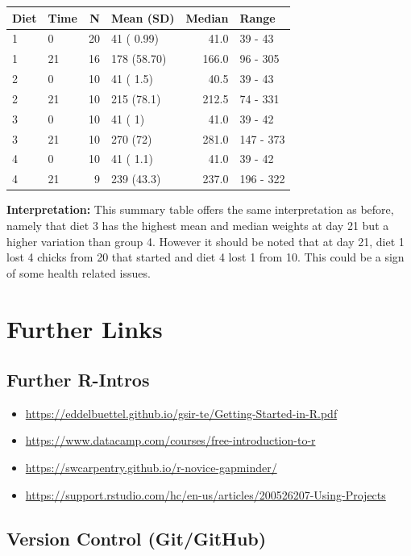 \documentclass[]{book}
\theoremstyle{definition}
\theoremstyle{definition}
\theoremstyle{definition}
\theoremstyle{remark}
\begin{document}
\begin{tabular}{l|l|r|l|r|l}
\hline
Diet & Time & N & Mean (SD) & Median & Range\\
\hline
1 & 0 & 20 & 41 ( 0.99) & 41.0 & 39 - 43\\
\hline
1 & 21 & 16 & 178 (58.70) & 166.0 & 96 - 305\\
\hline
2 & 0 & 10 & 41 ( 1.5) & 40.5 & 39 - 43\\
\hline
2 & 21 & 10 & 215 (78.1) & 212.5 & 74 - 331\\
\hline
3 & 0 & 10 & 41 ( 1) & 41.0 & 39 - 42\\
\hline
3 & 21 & 10 & 270 (72) & 281.0 & 147 - 373\\
\hline
4 & 0 & 10 & 41 ( 1.1) & 41.0 & 39 - 42\\
\hline
4 & 21 & 9 & 239 (43.3) & 237.0 & 196 - 322\\
\hline
\end{tabular}

\textbf{Interpretation:}
This summary table offers the same interpretation as before, namely that diet 3 has the
highest mean and median weights at day 21 but a higher variation than group 4.
However it should be noted that at day 21, diet 1 lost 4 chicks from 20 that started
and diet 4 lost 1 from 10. This could be a sign of some health related issues.

\hypertarget{further-links}{%
\section{Further Links}\label{further-links}}

\hypertarget{further-r-intros}{%
\subsection{Further R-Intros}\label{further-r-intros}}

\begin{itemize}
\item
  \url{https://eddelbuettel.github.io/gsir-te/Getting-Started-in-R.pdf}
\item
  \url{https://www.datacamp.com/courses/free-introduction-to-r}
\item
  \url{https://swcarpentry.github.io/r-novice-gapminder/}
\item
  \url{https://support.rstudio.com/hc/en-us/articles/200526207-Using-Projects}
\end{itemize}

\hypertarget{version-control-gitgithub}{%
\subsection{Version Control (Git/GitHub)}\label{version-control-gitgithub}}
\end{document}
